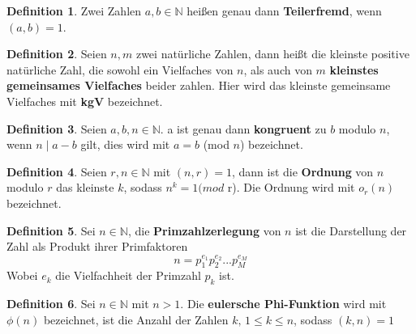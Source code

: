 \documentclass[12pt,oneside]{article}
\theoremstyle{remark}
\theoremstyle{definition}
\newtheorem{definition}{Definition}[section]
\begin{document}
\smallskip 

\begin{definition}\label{Df_2}
Zwei Zahlen $a,b \in \mathbb{N}$ heißen genau dann \textbf{Teilerfremd}, wenn $(a,b) = 1$.
\end{definition}

\smallskip

\begin{definition}
Seien $n, m$ zwei natürliche Zahlen, dann heißt die kleinste positive natürliche Zahl, die sowohl ein Vielfaches von $n$, als auch von $m$ \textbf{kleinstes gemeinsames Vielfaches} beider zahlen. Hier wird das kleinste gemeinsame Vielfaches mit \textbf{kgV} bezeichnet.
\end{definition}

\smallskip 

\begin{definition}\label{Df_3}
Seien $a, b, n \in \mathbb{N}$. a ist genau dann \textbf{kongruent} zu $b$ modulo $n$, wenn $n \mid a - b $ gilt, dies wird mit $a = b$ (mod $n$) bezeichnet.  
\end{definition}

\smallskip 

\begin{definition}\label{Df_4}
Seien $r,n \in \mathbb{N}$ mit $(n,r) = 1$, dann ist die \textbf{Ordnung} von $n$ modulo $r$ das kleinste $k$, sodass $n^k = 1 (mod $ r). Die Ordnung wird mit $o_{r}(n)$ bezeichnet.
\end{definition}

\smallskip


\begin{definition}\label{Df_5}
Sei $n \in \mathbb{N}$, die \textbf{Primzahlzerlegung} von $n$ ist die Darstellung der Zahl als Produkt ihrer Primfaktoren \newline
\begin{equation}
    n = p_{1}^{e_{1}}p_{2}^{e_{2}}...p_{M}^{e_{M}}
\end{equation}
Wobei $e_{k}$ die Vielfachheit der Primzahl $p_{k}$ ist.
\end{definition}

\smallskip


\begin{definition}\label{Df_6}
Sei $n \in \mathbb{N}$ mit $n > 1$. Die \textbf{eulersche Phi-Funktion} wird mit $\phi(n)$ bezeichnet, ist die Anzahl der Zahlen $k, \, 1 \leq k \leq n$, sodass $(k,n) = 1$
\end{definition}

\smallskip
\end{document}
